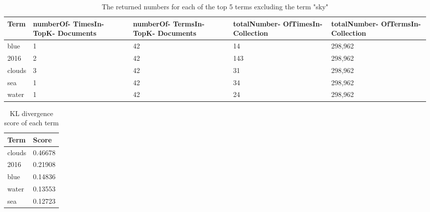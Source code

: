 \begin{table}
	\centering
    \begin{tabular}{l|p{30mm}|p{30mm}|p{30mm}|p{30mm}}
    \textbf{Term}   & \textbf{numberOf- \newline TimesIn- \newline TopK- \newline Documents} &
	\textbf{numberOf- \newline TermsIn- \newline TopK- \newline Documents} &
	\textbf{totalNumber- \newline OfTimesIn- \newline Collection} &
	\textbf{totalNumber- \newline OfTermsIn- \newline Collection} \\ \hline
    blue   & 1                            & 42                           & 14                             & 298,962                         \\ \hline
    2016   & 2                            & 42                           & 143                            & 298,962                         \\ \hline
    clouds & 3                            & 42                           & 31                             & 298,962                         \\ \hline
    sea    & 1                            & 42                           & 34                             & 298,962                         \\ \hline
    water  & 1                            & 42                           & 24                             & 298,962                         \\ \hline
\end{tabular}
	\caption{The returned numbers for each of the top 5 terms excluding the term "sky"}
	\label{tbl:kl-counts}
\end{table}

\begin{table}
	\centering
    \begin{tabular}{l|l}
    \textbf{Term}   & \textbf{Score}   \\ \hline
    clouds & 0.46678 \\ \hline
    2016   & 0.21908 \\ \hline
    blue   & 0.14836 \\ \hline
    water  & 0.13553 \\ \hline
    sea    & 0.12723 \\ \hline
    \end{tabular}
	\caption{KL divergence score of each term}
	\label{tbl:kl-score}
\end{table}
